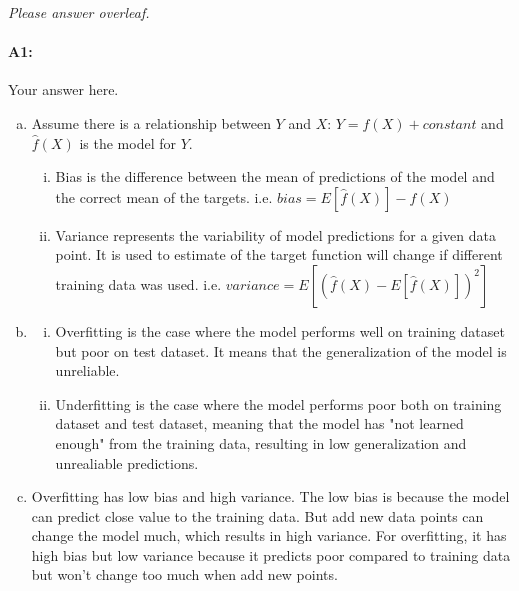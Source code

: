 \emph{Please answer overleaf.}

\pagebreak
\paragraph{A1:} Your answer here.

\begin{enumerate}[(a)]

    \item Assume there is a relationship between $Y$ and $X$: \(Y = f(X) + constant\) and $\hat{f}(X)$ is the model for $Y$.
          \begin{enumerate} [(i)]
              \item Bias is the difference between the mean of predictions of the model and the correct mean of the targets. i.e. \(bias = E[\hat{f}(X)] - f(X)\)
              \item Variance represents the variability of model predictions for a given data point. It is used to estimate of the target function will change if different training data was used. i.e. \(variance = E[(\hat{f}(X) - E[\hat{f}(X)])^2]\)
          \end{enumerate}

    \item
          \begin{enumerate} [(i)]
              \item Overfitting is the case where the model performs well on training dataset but poor on test dataset. It means that the generalization of the model is unreliable.
              \item Underfitting is the case where the model performs poor both on training dataset and test dataset, meaning that the model has "not learned enough" from the training data, resulting in low generalization and unrealiable predictions.
          \end{enumerate}
    \item Overfitting has low bias and high variance. The low bias is because the model can predict close value to the training data. But add new data points can change the model much, which results in high variance. For overfitting, it has high bias but low variance because it predicts poor compared to training data but won't change too much when add new points.

\end{enumerate}


